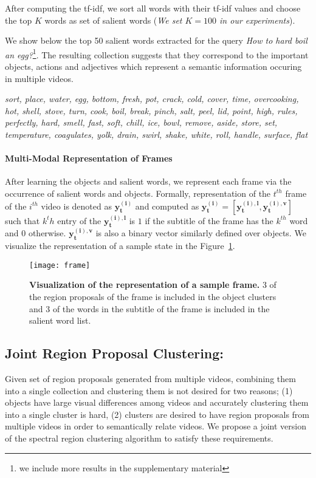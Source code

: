 After computing the tf-idf, we sort all words with their tf-idf values and choose the top $K$ words as set of salient words (\emph{We set $K=100$ in our experiments}).

We show below the top 50 salient words extracted for the query \emph{How to hard boil an egg?}\footnote{we include more results in the supplementary material}. The resulting collection suggests that they correspond to the important objects, actions and adjectives which represent a semantic information occuring in multiple videos.

\footnotesize
\emph{sort, place, water, egg, bottom, fresh, pot, crack, cold, cover, time, overcooking, hot, shell, stove, turn, cook, boil, break, pinch, salt, peel, lid, point, high, rules, perfectly, hard, smell, fast, soft, chill, ice, bowl, remove, aside, store, set, temperature, coagulates, yolk, drain, swirl, shake, white, roll, handle, surface, flat}
\normalsize

\paragraph{Multi-Modal Representation of Frames}
After learning the objects and salient words, we represent each frame via the occurrence of salient words and objects. Formally, representation of the $t^{th}$ frame of the $i^{th}$ video is denoted as $\mathbf{y^{(i)}_t}$ and computed as $\mathbf{y^{(i)}_t}=[\mathbf{y^{(i),l}_t},\mathbf{y^{(i),v}_t}]$ such that $k^th$ entry of the $\mathbf{y^{(i),l}_t}$ is $1$ if the subtitle of the frame has the $k^{th}$ word and $0$ otherwise. $\mathbf{y^{(i),v}_t}$ is also a binary vector similarly defined over objects. We visualize the representation of a sample state in the Figure~\ref{visFrame}.
\begin{figure}[h!]
  \texttt{[image: frame]}
  \caption{\textbf{Visualization of the representation of a sample frame.} 3 of the region proposals of the frame is included in the object clusters and 3 of the words in the subtitle of the frame is included in the salient word list.}
  \label{visFrame}
\end{figure}

\subsection{Joint Region Proposal Clustering:}
\label{jointProp}
Given set of region proposals generated from multiple videos, combining them into a single collection and clustering them is not desired for two reasons; (1) objects have large visual differences among videos and accurately clustering them into a single cluster is hard, (2) clusters are desired to have region proposals from multiple videos in order to semantically relate videos. We propose a joint version of the spectral region clustering algorithm to satisfy these requirements.


